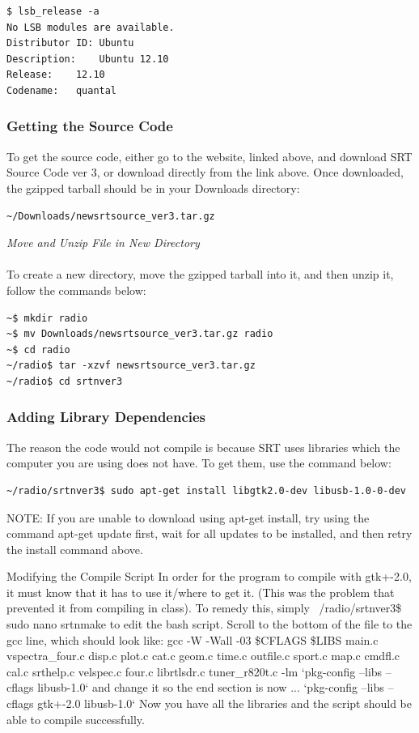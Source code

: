 \documentclass[11pt]{article} %
\begin{document}
\begin{verbatim}
$ lsb_release -a
No LSB modules are available.
Distributor ID: Ubuntu
Description:    Ubuntu 12.10
Release:    12.10
Codename:   quantal
\end{verbatim}



\subsubsection{Getting the Source Code}
To get the source code, either go to the website, linked above, and download SRT Source Code ver 3, or download directly from the link above. Once downloaded, the gzipped tarball should be in your Downloads directory: 
\begin{verbatim}
~/Downloads/newsrtsource_ver3.tar.gz
\end{verbatim}

\noindent\emph{Move and Unzip File in New Directory} 
\\ \\
To create a new directory, move the gzipped tarball into it, and then unzip it, follow the commands below:
\begin{verbatim}
~$ mkdir radio
~$ mv Downloads/newsrtsource_ver3.tar.gz radio
~$ cd radio
~/radio$ tar -xzvf newsrtsource_ver3.tar.gz
~/radio$ cd srtnver3
\end{verbatim}


\subsubsection{Adding Library Dependencies}
The reason the code would not compile is because SRT uses libraries which the computer you are using does not have. To get them, use the command below:

\begin{verbatim}
~/radio/srtnver3$ sudo apt-get install libgtk2.0-dev libusb-1.0-0-dev
\end{verbatim}


NOTE: If you are unable to download using apt-get install, try using the command apt-get update first, wait for all updates to be installed, and then retry the install command above.

Modifying the Compile Script
In order for the program to compile with gtk+-2.0, it must know that it has to use it/where to get it. (This was the problem that prevented it from compiling in class). To remedy this, simply
~/radio/srtnver3\$ sudo nano srtnmake
to edit the bash script. Scroll to the bottom of the file to the gcc line, which should look like:
gcc -W -Wall -03 \$CFLAGS \$LIBS main.c vspectra\_four.c disp.c plot.c cat.c geom.c time.c outfile.c sport.c map.c cmdfl.c cal.c srthelp.c velspec.c four.c librtlsdr.c tuner\_r820t.c -lm `pkg-config --libs --cflags libusb-1.0`
and change it so the end section is now
... `pkg-config --libs --cflags gtk+-2.0 libusb-1.0`
Now you have all the libraries and the script should be able to compile successfully.
\end{document}
